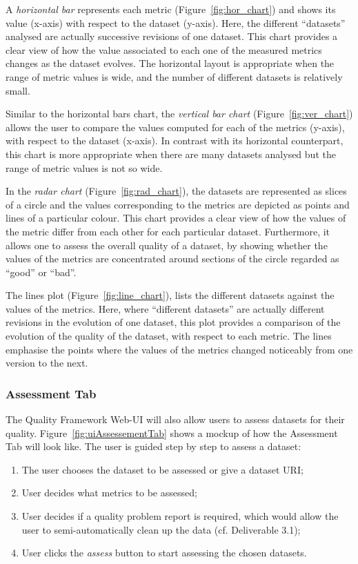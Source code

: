 A \emph{horizontal bar} represents each metric (Figure~\ref{fig:hor_chart}) and shows its value (x-axis) with respect to the dataset (y-axis).
Here, the different “datasets” analysed are actually successive revisions of one dataset.
This chart provides a clear view of how the value associated to each one of the measured metrics changes as the dataset evolves.
The horizontal layout is appropriate when the range of metric values is wide, and the number of different datasets is relatively small.

Similar to the horizontal bars chart, the \emph{vertical bar chart} (Figure~\ref{fig:ver_chart}) allows the user to compare the values computed for each of the metrics (y-axis), with respect to the dataset (x-axis).
In contrast with its horizontal counterpart, this chart is more appropriate when there are many datasets analysed but the range of metric values is not so wide.

In the \emph{radar chart} (Figure~\ref{fig:rad_chart}), the datasets are represented as slices of a circle and the values corresponding to the metrics are depicted as points and lines of a particular colour.
This chart provides a clear view of how the values of the metric differ from each other for each particular dataset. 
Furthermore, it allows one to assess the overall quality of a dataset, by showing whether the values of the metrics are concentrated around sections of the circle regarded as “good” or “bad”.

The lines plot (Figure~\ref{fig:line_chart}), lists the different datasets against the values of the metrics.
Here, where “different datasets” are actually different revisions in the evolution of one dataset, this plot provides a comparison of the evolution of the quality of the dataset, with respect to each metric.
The lines emphasise the points where the values of the metrics changed noticeably from one version to the next.


\subsubsection{Assessment Tab}
The Quality Framework Web-UI will also allow users to assess datasets for their quality.
Figure~\ref{fig:uiAssessementTab} shows a mockup of how the Assessment Tab will look like.
The user is guided step by step to assess a dataset:
\begin{enumerate}
\item The user chooses the dataset to be assessed or give a dataset URI;
\item User decides what metrics to be assessed;
\item User decides if a quality problem report is required, which would allow the user to semi-automatically clean up the data (cf. Deliverable 3.1);
\item User clicks the \emph{assess} button to start assessing the chosen datasets.
\end{enumerate}

